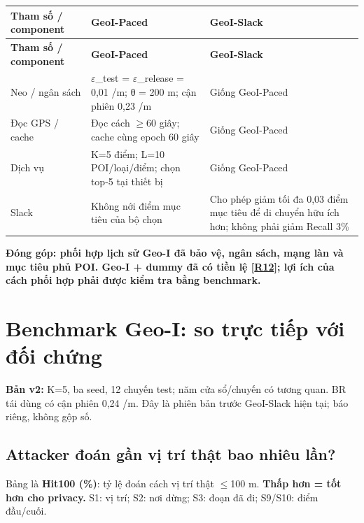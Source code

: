 \documentclass[10pt,a4paper]{article}
\newcommand{\key}[1]{\par\smallskip\noindent\colorbox{pale}{\parbox{\dimexpr\linewidth-2\fboxsep}{\textbf{#1}}}\par\smallskip}
\begin{document}
\begingroup\small
\begin{longtable}{@{}P{3.938cm}P{6.350cm}P{6.350cm}@{}}
\toprule
\textbf{Tham số / component} & \textbf{GeoI-Paced} & \textbf{GeoI-Slack}\\\midrule
\endfirsthead
\toprule
\textbf{Tham số / component} & \textbf{GeoI-Paced} & \textbf{GeoI-Slack}\\\midrule
\endhead
\bottomrule\endfoot
Neo / ngân sách & $\varepsilon$\_\allowbreak{}test = $\varepsilon$\_\allowbreak{}release = 0,01 /m; θ = 200 m; cận phiên 0,23 /m & Giống GeoI-Paced\\
\addlinespace[3pt]
Đọc GPS / cache & Đọc cách $\ge$60 giây; cache cùng epoch 60 giây & Giống GeoI-Paced\\
\addlinespace[3pt]
Dịch vụ & K=5 điểm; L=10 POI/loại/điểm; chọn top-5 tại thiết bị & Giống GeoI-Paced\\
\addlinespace[3pt]
Slack & Không nới điểm mục tiêu của bộ chọn & Cho phép giảm tối đa 0,03 điểm mục tiêu để di chuyển hữu ích hơn; không phải giảm Recall 3\%\\
\end{longtable}
\endgroup
\key{Đóng góp: phối hợp lịch sử Geo-I đã bảo vệ, ngân sách, mạng làn và mục tiêu phủ POI. Geo-I + dummy đã có tiền lệ [\hyperlink{ref-R12}{R12}]; lợi ích của cách phối hợp phải được kiểm tra bằng benchmark.}


\clearpage
\section{Benchmark Geo-I: so trực tiếp với đối chứng}\label{sec:3}
\textbf{Bản v2:} K=5, ba seed, 12 chuyến test; năm cửa sổ/chuyến có tương quan. BR tái dùng có cận phiên 0,24 /m. Đây là phiên bản trước GeoI-Slack hiện tại; báo riêng, không gộp số.

\subsection{Attacker đoán gần vị trí thật bao nhiêu lần?}\label{sub:3.1}
Bảng là \textbf{Hit100 (\%)}: tỷ lệ đoán cách vị trí thật $\le$100 m. \textbf{Thấp hơn = tốt hơn cho privacy.} S1: vị trí; S2: nơi dừng; S3: đoạn đã đi; S9/S10: điểm đầu/cuối.
\end{document}
